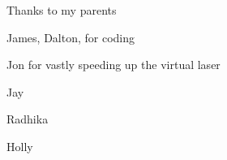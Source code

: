Thanks to my parents

James, Dalton, for coding

Jon for vastly speeding up the virtual laser

Jay

Radhika

Holly

